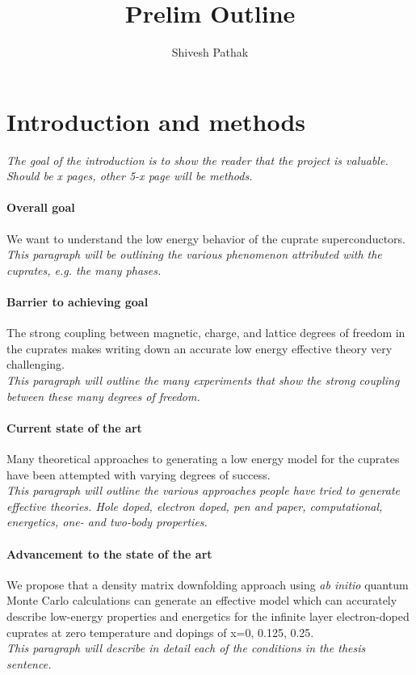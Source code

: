 \documentclass{article}
\title{Prelim Outline}
\author{Shivesh Pathak}
\begin{document}
\section{Introduction and methods}
\textit{The goal of the introduction is to show the reader that the project is valuable. Should be x pages, other 5-x page will be methods.}

\paragraph{Overall goal}
We want to understand the low energy behavior of the cuprate superconductors.
\\
\textit{This paragraph will be outlining the various phenomenon attributed with the cuprates, e.g. the many phases.}

\paragraph{Barrier to achieving goal}
The strong coupling between magnetic, charge, and lattice degrees of freedom in the cuprates makes writing down an accurate low energy effective theory very challenging.
\\
\textit{This paragraph will outline the many experiments that show the strong coupling between these many degrees of freedom.}

\paragraph{Current state of the art}
Many theoretical approaches to generating a low energy model for the cuprates have been attempted with varying degrees of success.
\\
\textit{This paragraph will outline the various approaches people have tried to generate effective theories. Hole doped, electron doped, pen and paper, computational, energetics, one- and two-body properties.}

\paragraph{Advancement to the state of the art}
We propose that a density matrix downfolding approach using \textit{ab initio} quantum Monte Carlo calculations can generate an effective model which can accurately describe low-energy properties and energetics for the infinite layer electron-doped cuprates at zero temperature and dopings of x=0, 0.125, 0.25.
\\
\textit{This paragraph will describe in detail each of the conditions in the thesis sentence.}
\end{document}
